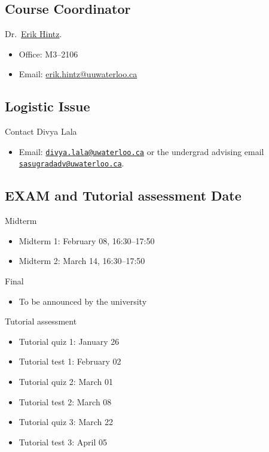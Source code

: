 \documentclass[
]{book}
\providecommand{\tightlist}{%
  \setlength{\itemsep}{0pt}\setlength{\parskip}{0pt}}
\theoremstyle{definition}
\theoremstyle{definition}
\theoremstyle{definition}
\theoremstyle{definition}
\theoremstyle{remark}
\begin{document}
\hypertarget{course-coordinator}{%
\subsection{Course Coordinator}\label{course-coordinator}}

Dr.~\href{https://uwaterloo.ca/scholar/ehintz}{Erik Hintz}.

\begin{itemize}
\tightlist
\item
  Office: M3--2106
\item
  Email: \href{mailto:erik.hintz@uwaterloo.ca}{erik.hintz@uuwaterloo.ca}
\end{itemize}

\hypertarget{logistic-issue}{%
\subsection{Logistic Issue}\label{logistic-issue}}

Contact Divya Lala

\begin{itemize}
\tightlist
\item
  Email: \href{mailto:divya.lala@uwaterloo.ca}{\nolinkurl{divya.lala@uwaterloo.ca}} or the undergrad advising email \href{mailto:sasugradadv@uwaterloo.ca}{\nolinkurl{sasugradadv@uwaterloo.ca}}.
\end{itemize}

\hypertarget{exam-and-tutorial-assessment-date}{%
\subsection{EXAM and Tutorial assessment Date}\label{exam-and-tutorial-assessment-date}}

Midterm

\begin{itemize}
\tightlist
\item
  Midterm 1: February 08, 16:30--17:50
\item
  Midterm 2: March 14, 16:30--17:50
\end{itemize}

Final

\begin{itemize}
\tightlist
\item
  To be announced by the university
\end{itemize}

Tutorial assessment

\begin{itemize}
\tightlist
\item
  Tutorial quiz 1: January 26
\item
  Tutorial test 1: February 02
\item
  Tutorial quiz 2: March 01
\item
  Tutorial test 2: March 08
\item
  Tutorial quiz 3: March 22
\item
  Tutorial test 3: April 05
\end{itemize}
\end{document}
